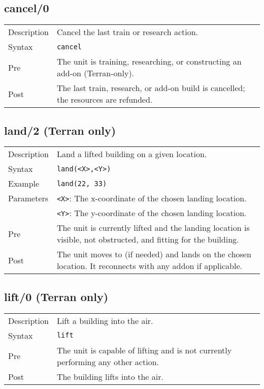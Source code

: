 \subsection{cancel/0}
\begin{tabularx}{\textwidth}{lX}
 Description & Cancel the last train or research action. \\
 Syntax & \verb|cancel| \\
 Pre & The unit is training, researching, or constructing an add-on (Terran-only). \\
 Post & The last train, research, or add-on build is cancelled; the resources are refunded.
\end{tabularx}

\subsection{land/2 (Terran only)}
\begin{tabularx}{\textwidth}{lX}
 Description & Land a lifted building on a given location. \\
 Syntax & \verb|land(<X>,<Y>)| \\
 Example & \verb|land(22, 33)| \\
 Parameters & \verb|<X>|: The x-coordinate of the chosen landing location. \\
            & \verb|<Y>|: The y-coordinate of the chosen landing location. \\
 Pre & The unit is currently lifted and the landing location is visible, not obstructed, and fitting for the building. \\
 Post & The unit moves to (if needed) and lands on the chosen location. It reconnects with any addon if applicable.
\end{tabularx}

\subsection{lift/0 (Terran only)}
\begin{tabularx}{\textwidth}{lX}
 Description & Lift a building into the air. \\
 Syntax & \verb|lift| \\
 Pre & The unit is capable of lifting and is not currently performing any other action. \\
 Post & The building lifts into the air.
\end{tabularx}

